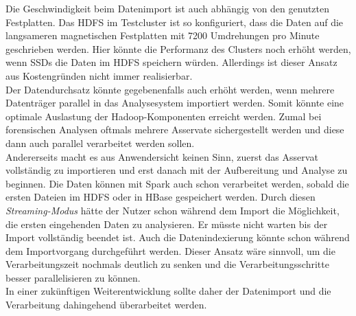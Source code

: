 \noindent
Die Geschwindigkeit beim Datenimport ist auch abhängig von den genutzten Festplatten. Das HDFS im Testcluster ist so konfiguriert, dass die Daten auf die langsameren magnetischen Festplatten mit 7200 Umdrehungen pro Minute geschrieben werden. 
Hier könnte die Performanz des Clusters noch erhöht werden, wenn SSDs die Daten im HDFS speichern würden. Allerdings ist dieser Ansatz aus Kostengründen nicht immer realisierbar.\\

\noindent
Der Datendurchsatz könnte gegebenenfalls auch erhöht werden, wenn mehrere Datenträger parallel in das Analysesystem importiert werden. 
Somit könnte eine optimale Auslastung der Hadoop-Komponenten erreicht werden. Zumal bei forensischen Analysen oftmals mehrere Asservate sichergestellt werden und diese dann auch parallel verarbeitet werden sollen.\\

\noindent
Andererseits macht es aus Anwendersicht keinen Sinn, zuerst das Asservat vollständig zu importieren und erst danach mit der Aufbereitung und Analyse zu beginnen. Die Daten können mit Spark auch schon verarbeitet werden, sobald die ersten Dateien im HDFS oder in HBase gespeichert werden. Durch diesen \textit{Streaming-Modus} hätte der Nutzer schon während dem Import die Möglichkeit, die ersten eingehenden Daten zu analysieren. Er müsste nicht warten bis der Import vollständig beendet ist. Auch die Datenindexierung könnte schon während dem Importvorgang durchgeführt werden. Dieser Ansatz wäre sinnvoll, um die Verarbeitungszeit nochmals deutlich zu senken und die Verarbeitungsschritte besser parallelisieren zu können.\\
In einer zukünftigen Weiterentwicklung sollte daher der Datenimport und die Verarbeitung dahingehend überarbeitet werden.